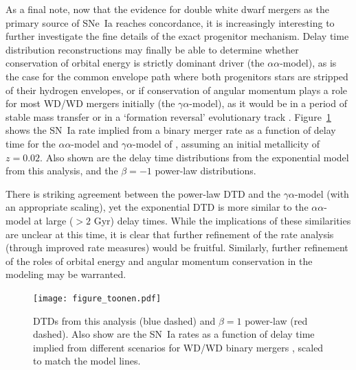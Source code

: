 \documentclass[apj, linenumbers]{aastex62}
\begin{document}
As a final note, now that the evidence for double white dwarf mergers as the primary source of SNe~Ia reaches concordance, it is increasingly interesting to further investigate the fine details of the exact progenitor mechanism. Delay time distribution reconstructions may finally be able to determine whether conservation of orbital energy is strictly dominant driver (the $\alpha\alpha$-model), as is the case for the common envelope path where both progenitors stars are stripped of their hydrogen envelopes, or if conservation of angular momentum plays a role for most WD/WD mergers initially (the $\gamma\alpha$-model), as it would be in a period of stable mass transfer or in a `formation reversal' evolutionary track \citep{Toonen:2013le}. Figure~\ref{fig:toonen} shows the SN~Ia rate implied from a binary merger rate as a function of delay time for the $\alpha\alpha$-model and $\gamma\alpha$-model of \cite{Toonen:2013ng}, assuming an initial metallicity of $z=0.02$. Also shown are the delay time distributions from the exponential model from this analysis, and the $\beta=-1$ power-law distributions. 

There is striking agreement between the power-law DTD and the $\gamma\alpha$-model (with an appropriate scaling), yet the exponential DTD is more similar to the $\alpha\alpha$-model at large ($>2$ Gyr) delay times. While the implications of these similarities are unclear at this time, it is clear that further refinement of the rate analysis (through improved rate measures) would be fruitful. Similarly, further refinement of the roles of orbital energy and angular momentum conservation in the modeling may be warranted. 

\begin{figure}[t] 
   \centering
   \texttt{[image: figure\_toonen.pdf]}
   \caption{\footnotesize DTDs from this analysis (blue dashed) and $\beta=1$ power-law (red dashed). Also show are the SN~Ia rates as a function of delay time implied from different scenarios for WD/WD binary mergers \citep[see][]{Toonen:2013ng}, scaled to match the model lines. }
   \label{fig:toonen}
\end{figure}
\end{document}
